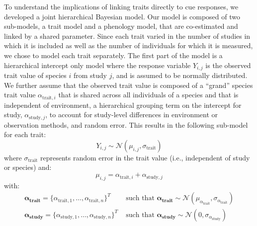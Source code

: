 \documentclass{article}\usepackage[]{graphicx}\usepackage[]{color}
\begin{document}
To understand the implications of linking traits directly to cue responses, we developed a joint hierarchical Bayesian model. Our model is composed of two sub-models, a trait model and a phenology model, that are co-estimated and linked by a shared parameter. Since each trait varied in the number of studies in which it is included as well as the number of individuals for which it is measured, we chose to model each trait separately. The first part of the model is a hierarchical intercept only model where the response variable $Y_{i,j}$ is the observed trait value of species $i$ from study $j$, and is assumed to be normally distributed. We further assume that the observed trait value is composed of a ``grand'' species trait value $\alpha_{\text{trait},i}$ that is shared across all individuals of a species and that is independent of environment, a hierarchical grouping term on the intercept for study, $\alpha_{\text{study},j}$, to account for study-level differences in environment or observation methods, and random error. This results in the following sub-model for each trait:
\begin{equation}
\label{TraitsLine_main}
Y_{i,j} \sim \mathcal{N}( \mu_{i,j}, \sigma_{\text{trait}})
\end{equation}
where $\sigma_{\text{trait}}$ represents random error in the trait value (i.e., independent of study or species) and:
\begin{equation}
\label{TraitsLine_main2}
\mu_{i,j} = \alpha_{\text{trait},i}+\alpha_{\text{study},j}
\end{equation}
with:
\begin{align}
\boldsymbol{\alpha_{\text{trait}}} = \{\alpha_{\text{trait},1}, \ldots, \alpha_{\text{trait},n}\}^T & \text{ such that }
  \boldsymbol{\alpha_{\text{trait}}} \sim \mathcal{N}(\mu_{\alpha_{\text{trait}}},\sigma_{\alpha_{\text{trait}}}) \\
\boldsymbol{\alpha_{\text{study}}} = \{\alpha_{\text{study},1}, \ldots, \alpha_{\text{study},n}\}^T & \text{ such that }
  \boldsymbol{\alpha_{\text{study}}} \sim \mathcal{N}(0,\sigma_{\alpha_{\text{study}}}) \nonumber
\end{align}
\end{document}
